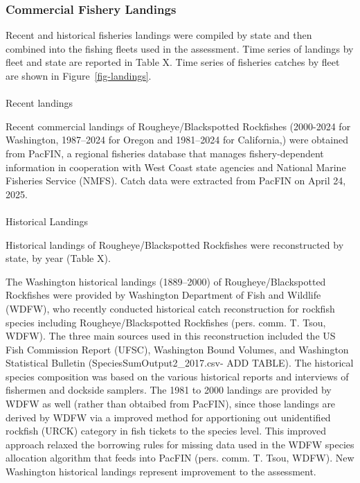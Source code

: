\documentclass[
]{scrartcl}
\makeatletter
\let\oldparagraph\paragraph
\renewcommand{\paragraph}{
    \@ifstar
      \xxxParagraphStar
      \xxxParagraphNoStar
  }
\newcommand{\xxxParagraphStar}[1]{\oldparagraph*{#1}\mbox{}}
\newcommand{\xxxParagraphNoStar}[1]{\oldparagraph{#1}\mbox{}}
\makeatother
\begin{document}
\subsubsection{Commercial Fishery
Landings}\label{commercial-fishery-landings}

Recent and historical fisheries landings were compiled by state and then
combined into the fishing fleets used in the assessment. Time series of
landings by fleet and state are reported in Table X. Time series of
fisheries catches by fleet are shown in Figure~\ref{fig-landings}.

\paragraph{Recent landings}\label{recent-landings}

Recent commercial landings of Rougheye/Blackspotted Rockfishes
(2000-2024 for Washington, 1987--2024 for Oregon and 1981--2024 for
California,) were obtained from PacFIN, a regional fisheries database
that manages fishery-dependent information in cooperation with West
Coast state agencies and National Marine Fisheries Service (NMFS). Catch
data were extracted from PacFIN on April 24, 2025.

\paragraph{Historical Landings}\label{historical-landings}

Historical landings of Rougheye/Blackspotted Rockfishes were
reconstructed by state, by year (Table X).

The Washington historical landings (1889--2000) of Rougheye/Blackspotted
Rockfishes were provided by Washington Department of Fish and Wildlife
(WDFW), who recently conducted historical catch reconstruction for
rockfish species including Rougheye/Blackspotted Rockfishes (pers. comm.
T. Tsou, WDFW). The three main sources used in this reconstruction
included the US Fish Commission Report (UFSC), Washington Bound Volumes,
and Washington Statistical Bulletin (SpeciesSumOutput2\_2017.csv- ADD
TABLE). The historical species composition was based on the various
historical reports and interviews of fishermen and dockside samplers.
The 1981 to 2000 landings are provided by WDFW as well (rather than
obtaibed from PacFIN), since those landings are derived by WDFW via a
improved method for apportioning out unidentified rockfish (URCK)
category in fish tickets to the species level. This improved approach
relaxed the borrowing rules for missing data used in the WDFW species
allocation algorithm that feeds into PacFIN (pers. comm. T. Tsou, WDFW).
New Washington historical landings represent improvement to the
assessment.
\end{document}
